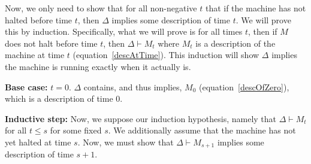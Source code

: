 Now, we only need to show that for all non-negative $t$ that if the machine has not halted before time $t$, then $\Delta$ implies some description of time $t$. We will prove this by induction. Specifically, what we will prove is for all times $t$, then if $M$ does not halt before time $t$, then $\Delta \vdash M_t$ where $M_t$ is a description of the machine at time $t$ (equation~\ref{descAtTime}). This induction will show $\Delta$ implies the machine is running exactly when it actually is.

\noindent\textbf{Base case:} $t=0$. $\Delta$ contains, and thus implies, $M_0$ (equation~\ref{descOfZero}), which is a description of time $0$.

\noindent\textbf{Inductive step:} Now, we suppose our induction hypothesis, namely that $\Delta\vdash M_t$ for all $t \leq s$ for some fixed $s$. We additionally assume that the machine has not yet halted at time $s$. Now, we must show that $\Delta\vdash M_{s+1}$ implies some description of time $s+1$.

